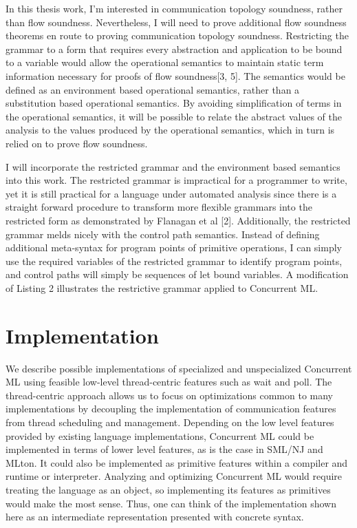 \documentclass{article}
\begin{document}
In this thesis work, I'm interested in communication topology soundness, rather than flow
soundness.  Nevertheless, I will need to prove additional flow soundness theorems en route to
proving communication topology soundness.  Restricting the grammar to a form that requires
every abstraction and application to be bound to a variable would allow the operational
semantics to maintain static term information necessary for proofs of flow soundness[3, 5].
The semantics would be defined as an environment based operational semantics, rather than a
substitution based operational semantics.  By avoiding simplification of terms in the
operational semantics, it will be possible to relate the abstract values of the analysis to the
values produced by the operational semantics, which in turn is relied on to prove flow
soundness.


I will incorporate the restricted grammar and the environment based semantics into this work.
The restricted grammar is impractical for a programmer to write, yet it is still practical for
a language under automated analysis since there is a straight forward procedure to transform
more flexible grammars into the restricted form as demonstrated by Flanagan et al [2].
Additionally, the restricted grammar melds nicely with the control path semantics.  Instead of
defining additional meta-syntax for program points of primitive operations, I can simply use
the required variables of the restricted grammar to identify program points, and control paths
will simply be sequences of let bound variables. A modification of Listing 2 illustrates the
restrictive grammar applied to Concurrent ML.


\section{Implementation}
We describe possible implementations of specialized and unspecialized Concurrent ML using
feasible low-level thread-centric features such as wait and poll.  The thread-centric approach
allows us to focus on optimizations common to many implementations by decoupling the
implementation of communication features from thread scheduling and management.  Depending on
the low level features provided by existing language implementations, Concurrent ML could be
implemented in terms of lower level features, as is the case in SML/NJ and MLton.  It could
also be implemented as primitive features within a compiler and runtime or interpreter.
Analyzing and optimizing Concurrent ML would require treating the language as an object, so
implementing its features as primitives would make the most sense.  Thus, one can think of the
implementation shown here as an intermediate representation presented with concrete syntax.
\end{document}
